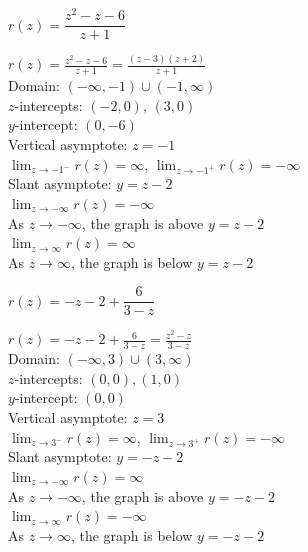 \documentclass{ximera}
\begin{document}
\begin{question}
\begin{problem}
\begin{solution}
\begin{center} 
\end{center}
\end{solution}
\end{problem} 

\begin{problem}
$r(z) = \dfrac{z^2-z-6}{z+1}$

\begin{solution}
$r(z) = \frac{z^2-z-6}{z+1} = \frac{(z-3)(z+2)}{z+1}$\\
Domain: $(-\infty, -1) \cup (-1, \infty)$\\
$z$-intercepts:  $(-2,0)$, $(3,0)$\\
$y$-intercept:  $(0,-6)$\\
Vertical asymptote: $z = -1$\\
$\lim_{z \rightarrow -1^{-}} r(z) = \infty$, $\lim_{z \rightarrow -1^{+}} r(z) = -\infty$\\
Slant asymptote: $y = z-2$ \\
$\lim_{z \rightarrow -\infty} r(z) = -\infty$\\
As $z \rightarrow -\infty$, the graph is above $y=z-2$\\
$\lim_{z \rightarrow \infty} r(z) = \infty$\\
As $z \rightarrow \infty$, the graph is below $y=z-2$\\

\begin{center} 
\end{center}
\end{solution}
\end{problem}  

\begin{problem}
$r(z) =-z-2+\dfrac{6}{3-z}$

\begin{solution}
$r(z) = -z-2+\frac{6}{3-z} = \frac{z^2-z}{3-z}$\\
Domain: $(-\infty, 3) \cup (3, \infty)$\\
$z$-intercepts:   $(0,0), (1,0)$\\
$y$-intercept:  $(0,0)$ \\
Vertical asymptote: $z = 3$\\
$\lim_{z \rightarrow 3^{-}} r(z) = \infty$, $\lim_{z \rightarrow 3^{+}} r(z) = -\infty$\\
Slant asymptote: $y = -z-2$ \\
$\lim_{z \rightarrow -\infty} r(z) = \infty$\\
As $z \rightarrow -\infty$, the graph is above $y=-z-2$\\
$\lim_{z \rightarrow \infty} r(z) = -\infty$\\
As $z \rightarrow \infty$, the graph is below $y=-z-2$\\


\end{solution}
\end{problem}
\end{question}
\end{document}
